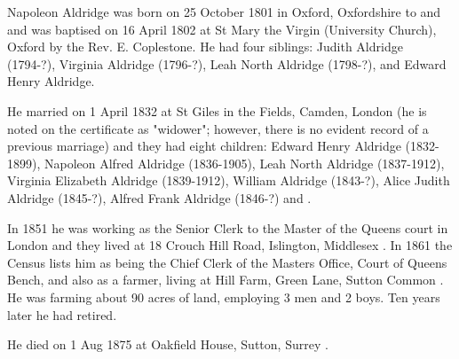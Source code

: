 
Napoleon Aldridge was born on 25 October 1801 in Oxford, Oxfordshire to  and \cite{NapoleonAldridgeBirth} and was baptised on 16 April 1802 at St Mary the Virgin (University Church), Oxford by the Rev. E. Coplestone.  He had four siblings:  Judith Aldridge (1794-?), Virginia Aldridge (1796-?), Leah North Aldridge (1798-?), and Edward Henry Aldridge.

He married  on 1 April 1832 at St Giles in the Fields, Camden, London \cite{NapoleonAldridgeMarriage}  (he is noted on the certificate as "widower"; however, there is no evident record of a previous marriage) and they had eight children:  Edward Henry Aldridge (1832-1899),  Napoleon Alfred Aldridge (1836-1905), Leah North Aldridge (1837-1912), Virginia Elizabeth Aldridge (1839-1912), William Aldridge (1843-?), Alice Judith Aldridge (1845-?), Alfred Frank Aldridge (1846-?) and .

In 1851 he was working as the Senior Clerk to the Master of the Queens court in London and they lived at 18 Crouch Hill Road, Islington, Middlesex \cite{NapoleonAldridgeOccupation}.  In 1861 the Census lists him as being the Chief Clerk of the Masters Office, Court of Queens Bench, and also as a farmer, living at Hill Farm, Green Lane, Sutton Common \cite{NapoleonAldridgeResidence}.  He was farming about 90 acres of land, employing 3 men and 2 boys.  Ten years later he had retired.

He died on 1 Aug 1875 at Oakfield House, Sutton, Surrey \cite{NapoleonAldridgeDeath}.
